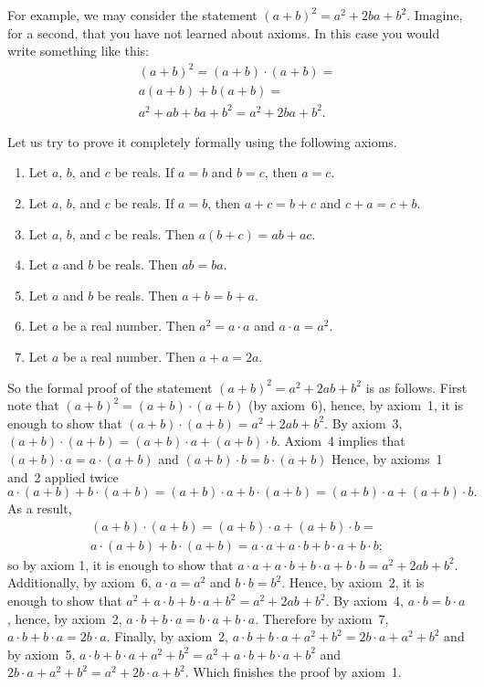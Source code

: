 For example, we may consider the statement $(a + b)^2 = a^2 + 2ba + b^2$.
Imagine, for a second, that you have not learned about axioms.
In this case you would write something like this:
\begin{multline*}
    (a + b)^2 = (a + b) \cdot (a + b) = \\
    a (a + b) + b (a + b) = \\
    a^2 + ab + ba + b^2 = a^2 + 2ba + b^2.
\end{multline*}

Let us try to prove it completely formally using the following axioms.
\begin{enumerate}
  \item Let $a$, $b$, and $c$ be reals. If $a = b$ and $b = c$, then $a = c$.
  \item Let $a$, $b$, and $c$ be reals. If $a = b$, then $a + c = b + c$ and
    $c + a = c + b$.
  \item Let $a$, $b$, and $c$ be reals. Then $a (b + c) = ab + ac$.
  \item Let $a$ and $b$ be reals. Then $ab = ba$.
  \item Let $a$ and $b$ be reals. Then $a + b = b + a$.
  \item Let $a$ be a real number. Then $a^2 = a \cdot a$ and $a \cdot a = a^2$.
  \item Let $a$ be a real number. Then $a + a = 2a$.
\end{enumerate}
So the formal proof of the statement $(a + b)^2 = a^2 + 2ab + b^2$ is as
follows. First note that $(a + b)^2 = (a + b) \cdot (a + b)$ (by axiom~6),
hence, by axiom~1, it is enough to show that
$(a + b) \cdot (a + b) = a^2 + 2ab + b^2$. By axiom~3,
$(a + b) \cdot (a + b) = (a + b) \cdot a + (a + b) \cdot b$. Axiom~4 implies
that $(a + b) \cdot a = a \cdot (a + b)$ and $(a + b) \cdot b = b \cdot (a + b)$
Hence, by axioms~1 and~2 applied twice
\[
  a \cdot (a + b) + b \cdot (a + b) =
  (a + b) \cdot a + b \cdot (a + b) =
  (a + b) \cdot a + (a + b) \cdot b.
\]
As a result,
\begin{multline*}
  (a + b) \cdot (a + b) =
  (a + b) \cdot a + (a + b) \cdot b = \\
  a \cdot (a + b) + b \cdot (a + b) =
  a \cdot a + a \cdot b + b \cdot a + b \cdot b;
\end{multline*}
so by axiom 1, it is enough
to show that $a \cdot a + a \cdot b + b \cdot a + b \cdot b = a^2 + 2ab + b^2$.
Additionally, by axiom~6, $a \cdot a = a^2$ and $b \cdot b = b^2$. Hence, by
axiom~2, it is enough to show that
$a^2 + a \cdot b + b \cdot a + b^2 = a^2 + 2ab + b^2$. By axiom~4,
$a \cdot b = b \cdot a$, hence, by axiom~2,
$a \cdot b + b \cdot a = b \cdot a + b \cdot a$. Therefore by axiom~7,
$a \cdot b + b \cdot a = 2 b \cdot a$. Finally, by axiom~2,
$a \cdot b + b \cdot a + a^2 + b^2 = 2b \cdot a + a^2 + b^2$ and by axiom~5,
$a \cdot b + b \cdot a + a^2 + b^2 = a^2 + a \cdot b + b \cdot a + b^2$ and
$2b \cdot a + a^2 + b^2 =  a^2 + 2b \cdot a + b^2$. Which finishes the proof by
axiom~1.


